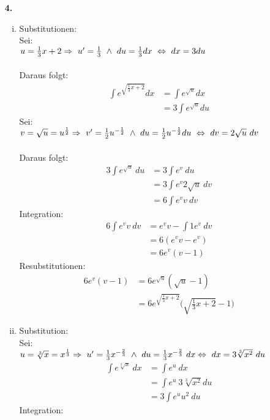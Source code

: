 \documentclass[a4paper]{scrartcl}
\begin{document}
\begin{enumerate}
\newpage
\item[\textbf{4.}]
\begin{enumerate}[(i)]
\item
Substitutionen:\\
Sei:\\
\(u=\frac{1}{3}x +2\\ 
\Rightarrow \ u'=\frac{1}{3}\ \land \ du=\frac{1}{3}dx\ \Leftrightarrow\ dx=3du\)\\
 \\
Daraus folgt:
\begin{align}
\int e^{\sqrt{\frac{1}{3}x+2}}dx &=\int e^{\sqrt{u}} dx\\
	&=3\int e^{\sqrt{u}} du
\end{align}
Sei:\\
\(v=\sqrt{u}=u^{\frac{1}{2}}\\
\Rightarrow \ v'=\frac{1}{2} u^{-\frac{1}{2}}\ \land \ du=\frac{1}{2} u^{-\frac{1}{2}} du\ \Leftrightarrow \ dv=2 \sqrt{u}\ dv\)\\
\\
Daraus folgt:
\begin{align}
3\int e^{\sqrt{u}}\ du &=3\int e^v\ du\\
	&=3\int e^v 2\sqrt{u}\ dv\\	
	&=6 \int e^v v\ dv
\end{align}
Integration:
\begin{align}
6\int e^v v\ dv &= e^v v- \int 1e^v\ dv\\
	&= 6(e^v v-e^v)\\
	&= 6e^v(v-1)
\end{align}
Resubstitutionen:
\begin{align}
6e^v(v-1) &= 6e^{\sqrt{u}}(\sqrt{u}-1)\\
	&=6e^{\sqrt{\frac{1}{3}x+2}}\bigg(\sqrt{\frac{1}{3}x+2}-1\bigg)
\end{align}
\newpage
\item
Substitution:\\
Sei:\\
\(u=\sqrt[3]{x}=x^{\frac{1}{3}}\\
\Rightarrow \ u'=\frac{1}{3}x^{-\frac{2}{3}} \ \land \ du=\frac{1}{3}x^{-\frac{2}{3}}\ dx \Leftrightarrow \ dx=3 \sqrt[3]{x^2}\ du\)
\begin{align}
\int e^{\sqrt[3]{x}}\ dx &=\int e^u\ dx\\
	&=\int e^u\ 3\sqrt[3]{x^2}du\\
	&=3\int e^u u^2\ du
\end{align}
Integration:\\

\end{enumerate}
\end{enumerate}
\end{document}

